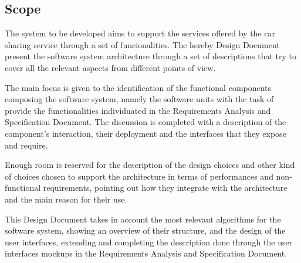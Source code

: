 \subsection{Scope}

The system to be developed aims to support the services offered by the car sharing service through a set of funcionalities.
The hereby Design Document present the software system architecture through a set of descriptions that try to cover all the relevant aspects from different points of view.

The main focus is given to the identification of the functional components composing the software system, namely the software units with the task of provide the functionalities individuated in the Requirements Analysis and Specification Document.
The discussion is completed with a description of the component's interaction, their deployment and the interfaces that they expose and require.

Enough room is reserved for the description of the design choices and other kind of choices chosen to support the architecture in terms of performances and non-functional requirements, pointing out how they integrate with the architecture and the main reason for their use.

This Design Document takes in account the most relevant algorithms for the software system, showing an overview of their structure, and the design of the user interfaces, extending and completing the description done through the user interfaces mockups in the Requirements Analysis and Specification Document.

 
